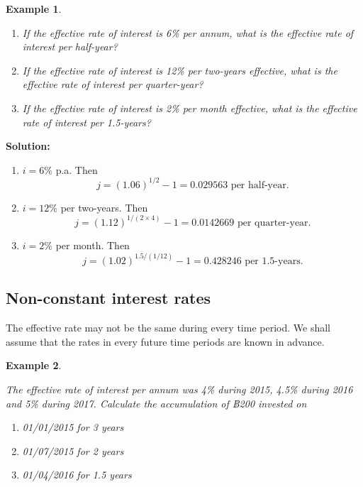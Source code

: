 \documentclass[
]{book}
\theoremstyle{definition}
\theoremstyle{definition}
\newtheorem{example}{Example}[chapter]
\theoremstyle{definition}
\theoremstyle{definition}
\theoremstyle{remark}
\begin{document}
\begin{example}
\protect\hypertarget{exm:unlabeled-div-18}{}\label{exm:unlabeled-div-18}

\begin{enumerate}
\def\labelenumi{\arabic{enumi}.}
\item
  \emph{If the effective rate of interest is 6\% per annum, what is the
  effective rate of interest per half-year?}
\item
  \emph{If the effective rate of interest is 12\% per two-years effective,
  what is the effective rate of interest per quarter-year?}
\item
  \emph{If the effective rate of interest is 2\% per month effective, what
  is the effective rate of interest per 1.5-years?}
\end{enumerate}

\end{example}

\textbf{Solution:}

\begin{enumerate}
\def\labelenumi{\arabic{enumi}.}
\item
  \(i = 6\%\) p.a. Then
  \[j = (1.06)^{1/2} -1 = 0.029563 \text{ per half-year}.\]
\item
  \(i = 12\%\) per two-years. Then
  \[j = (1.12)^{1/(2\times4)} -1 = 0.0142669 \text{ per quarter-year}.\]
\item
  \(i = 2\%\) per month. Then
  \[j = (1.02)^{1.5/(1/12)} -1 = 0.428246 \text{ per 1.5-years}.\]
\end{enumerate}

\hypertarget{non-constant-interest-rates}{%
\subsection{Non-constant interest rates}\label{non-constant-interest-rates}}

The effective rate may not be the same during every time period. We
shall assume that the rates in every future time periods are known in
advance.

\begin{example}
\protect\hypertarget{exm:unlabeled-div-19}{}\label{exm:unlabeled-div-19}

\emph{The effective rate of interest per annum was 4\% during 2015, 4.5\%
during 2016 and 5\% during 2017. Calculate the accumulation of ฿200
invested on}

\begin{enumerate}
\def\labelenumi{\arabic{enumi}.}
\item
  \emph{01/01/2015 for 3 years}
\item
  \emph{01/07/2015 for 2 years}
\item
  \emph{01/04/2016 for 1.5 years}
\end{enumerate}

\end{example}
\end{document}
